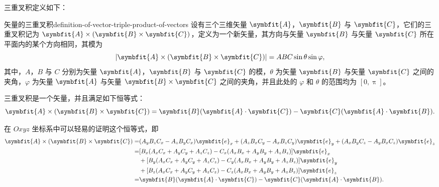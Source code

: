 三重叉积定义如下：
\begin{definition}{矢量的三重叉积}{definition-of-vector-triple-product-of-vectors}
    设有三个三维矢量 $ \symbfit{A} $，$ \symbfit{B} $ 与 $ \symbfit{C} $，它们的三重叉积记为 $ \symbfit{A} \times (\symbfit{B} \times \symbfit{C}) $，定义为一个新矢量，其方向与矢量 $ \symbfit{B} $ 与矢量 $ \symbfit{C} $ 所在平面内的某个方向相同，其模为
    \begin{equation}
        |\symbfit{A} \times (\symbfit{B} \times \symbfit{C})| = AB C \sin \theta \sin \varphi ,
    \end{equation}
    其中，$ A $，$ B $ 与 $ C $ 分别为矢量 $ \symbfit{A} $，$ \symbfit{B} $ 与 $ \symbfit{C} $ 的模，$ \theta $ 为矢量 $ \symbfit{B} $ 与矢量 $ \symbfit{C} $ 之间的夹角，$ \varphi $ 为矢量 $ \symbfit{A} $ 与矢量 $ \symbfit{B} \times \symbfit{C} $ 之间的夹角，并且此处的 $ \varphi $ 和 $ \theta $ 的范围均为 $ [0 , \uppi] $。
\end{definition}
三重叉积是一个矢量，并且满足如下恒等式：
\begin{equation}
    \symbfit{A} \times (\symbfit{B} \times \symbfit{C}) = \symbfit{B} (\symbfit{A} \cdot \symbfit{C}) - \symbfit{C} (\symbfit{A} \cdot \symbfit{B}) .
\end{equation}

在 $ Oxyz $ 坐标系中可以轻易的证明这个恒等式，即
\begin{equation}
    \begin{aligned}
        \symbfit{A} \times (\symbfit{B} \times \symbfit{C}) = & (A_y B_z C_x - A_z B_y C_x) \symbfit{e}_x + (A_z B_x C_y - A_x B_z C_y) \symbfit{e}_y + (A_x B_y C_z - A_y B_x C_z) \symbfit{e}_z \\
        =                                                     & [B_x (A_x C_x + A_y C_y + A_z C_z) - C_x (A_x B_x + A_y B_y + A_z B_z)] \symbfit{e}_x                                             \\
                                                              & + [B_y (A_x C_x + A_y C_y + A_z C_z) - C_y (A_x B_x + A_y B_y + A_z B_z)] \symbfit{e}_y                                           \\
                                                              & + [B_z (A_x C_x + A_y C_y + A_z C_z) - C_z (A_x B_x + A_y B_y + A_z B_z)] \symbfit{e}_z                                           \\
        =                                                     & \symbfit{B} (\symbfit{A} \cdot \symbfit{C}) - \symbfit{C} (\symbfit{A} \cdot \symbfit{B}) .
    \end{aligned}
\end{equation}

